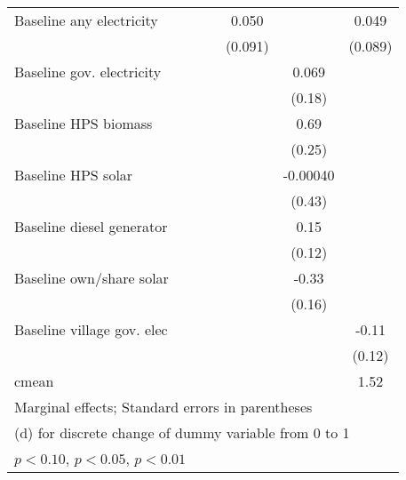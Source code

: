 \begin{table}[htbp]
\begin{tabular*}{1\hsize}{@{\hskip\tabcolsep\extracolsep\fill}l*{6}{c}}
Baseline any electricity&                  &                  &                  &    0.050         &                  &    0.049         \\
                &                  &                  &                  &  (0.091)         &                  &  (0.089)         \\
Baseline gov. electricity&                  &                  &                  &                  &    0.069         &                  \\
                &                  &                  &                  &                  &   (0.18)         &                  \\
Baseline HPS biomass&                  &                  &                  &                  &     0.69\sym{***}&                  \\
                &                  &                  &                  &                  &   (0.25)         &                  \\
Baseline HPS solar&                  &                  &                  &                  & -0.00040         &                  \\
                &                  &                  &                  &                  &   (0.43)         &                  \\
Baseline diesel generator&                  &                  &                  &                  &     0.15         &                  \\
                &                  &                  &                  &                  &   (0.12)         &                  \\
Baseline own/share solar&                  &                  &                  &                  &    -0.33\sym{**} &                  \\
                &                  &                  &                  &                  &   (0.16)         &                  \\
Baseline village gov. elec&                  &                  &                  &                  &                  &    -0.11         \\
                &                  &                  &                  &                  &                  &   (0.12)         \\
\midrule
cmean           &                  &                  &                  &                  &                  &     1.52         \\
\bottomrule
\multicolumn{7}{l}{\footnotesize Marginal effects; Standard errors in parentheses}\\
\multicolumn{7}{l}{\footnotesize  (d) for discrete change of dummy variable from 0 to 1}\\
\multicolumn{7}{l}{\footnotesize \sym{*} \(p<0.10\), \sym{**} \(p<0.05\), \sym{***} \(p<0.01\)}\\
\end{tabular*}
\end{table}
